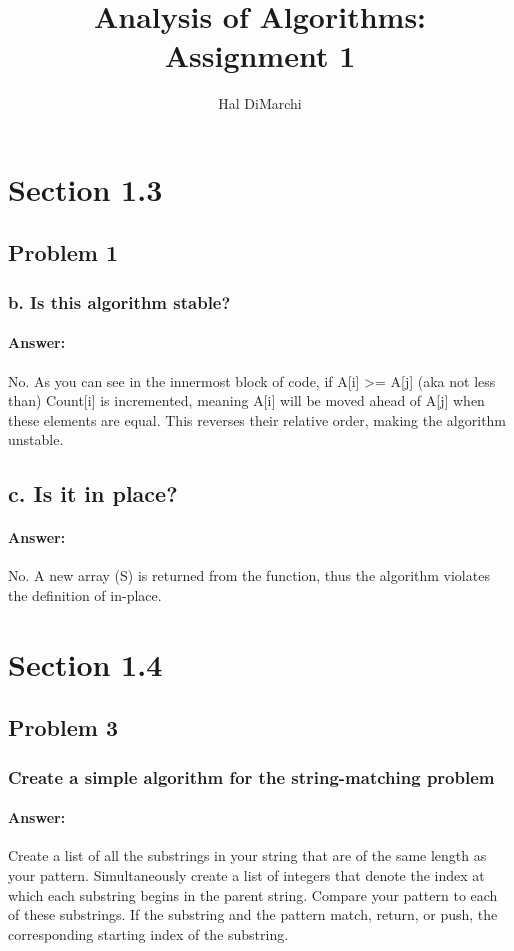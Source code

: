 \documentclass{article}
\title{Analysis of Algorithms: Assignment 1}
\author{Hal DiMarchi}
\begin{document}
\maketitle
\newpage
{}
\section{Section 1.3}
  \subsection{Problem 1}
    \subsubsection{b. Is this algorithm stable?}
      \paragraph{Answer:}
        No. As you can see in the innermost block of code, if A[i] >= A[j] (aka not less than)
        Count[i] is incremented, meaning A[i] will be moved ahead of A[j] when these elements are equal.
        This reverses their relative order, making the algorithm unstable.
    \subsection{c. Is it in place?}
      \paragraph{Answer:}
        No. A new array (S) is returned from the function, thus the algorithm violates the definition of in-place.
\section{Section 1.4}
  \subsection{Problem 3}
    \subsubsection{Create a simple algorithm for the string-matching problem}
      \paragraph{Answer:}
        Create a list of all the substrings in your string that are of the same length as your pattern.
        Simultaneously create a list of integers that denote the index at which each substring begins in the parent
        string.
        Compare your pattern to each of these substrings. If the substring and the pattern match, return, or push, the corresponding
        starting index of the substring.
\end{document}
